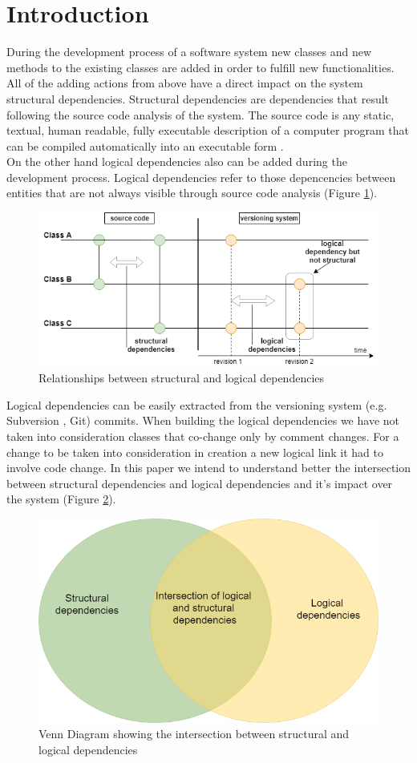 \documentclass[conference,compsoc]{IEEEtran}
\begin{document}
\section{Introduction}
During the development process of a software system new classes and new methods to the existing classes are added in order to fulfill new functionalities. All of the adding actions from above have a direct impact on the system structural dependencies. Structural dependencies are dependencies that result following the source code analysis of the system. The source code is any static, textual, human readable, fully executable description of a computer program that can be compiled automatically into an executable form\cite{ct1} .\\ On the other hand logical dependencies also can be added during the development process. Logical dependencies refer to those depencencies between entities that are not always visible through source code analysis (Figure \ref{fig:fig1}).
\begin{figure}[H]
\includegraphics[scale=0.45]{fig1.png}
\caption{Relationships between structural and logical dependencies }
\label{fig:fig1}
\centering
\end{figure}
Logical dependencies can be easily extracted from the versioning system (e.g. Subversion , Git) commits. When building the logical dependencies we have not taken into consideration classes that co-change only by comment changes. For a change to be taken into consideration in creation a new logical link it had to involve code change.  In this paper we intend to understand better the intersection between structural dependencies and logical dependencies and it's impact over the system (Figure \ref{fig:fig2}). 
\begin{figure}[H]
\includegraphics[scale=0.35]{fig2.png}
\caption{Venn Diagram showing the intersection between structural and logical dependencies }
\label{fig:fig2}
\end{figure}
\end{document}
